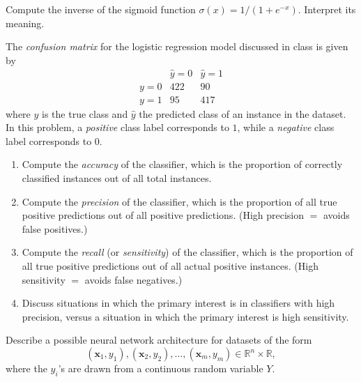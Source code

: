 \documentclass[12pt,reqno]{amsart}
\begin{document}
\vfill
\prob Compute the inverse of the sigmoid function $\sigma(x) = 1/(1+e^{-x})$. Interpret its meaning.













\vfill
\newpage
\prob The \textit{confusion matrix} for the logistic regression model discussed in class is given by
	\[\begin{array}{c|cc}
	& \hat{y}=0 & \hat{y} = 1 \\ \hline
	y=0 & 422 & 90 \\
	y=1 & 95 & 417
	\end{array}
	\]
where $y$ is the true class and $\hat{y}$ the predicted class of an instance in the dataset. In this problem, a \textit{positive} class label corresponds to $1$, while a \textit{negative} class label corresponds to $0$.

\medskip
\begin{enumerate}
\item Compute the \textit{accuracy} of the classifier, which is the proportion of correctly classified instances out of all total instances.\vfill
\item Compute the \textit{precision} of the classifier, which is the proportion of all true positive predictions out of all positive predictions. (High precision $=$ avoids false positives.)\vfill
\item Compute the \textit{recall} (or \textit{sensitivity}) of the classifier, which is the proportion of all true positive predictions out of all actual positive instances. (High sensitivity $=$ avoids false negatives.)\vfill
\item Discuss situations in which the primary interest is in classifiers with high precision, versus a situation in which the primary interest is high sensitivity.
\end{enumerate}







\vfill
\prob Describe a possible neural network architecture for datasets of the form
	\[(\mathbf{x}_1,y_1),(\mathbf{x}_2,y_2),\ldots,(\mathbf{x}_m,y_m) \in \mathbb{R}^n \times \mathbb{R},
	\]
where the $y_i$'s are drawn from a continuous random variable $Y$.

\vfill
\end{document}
